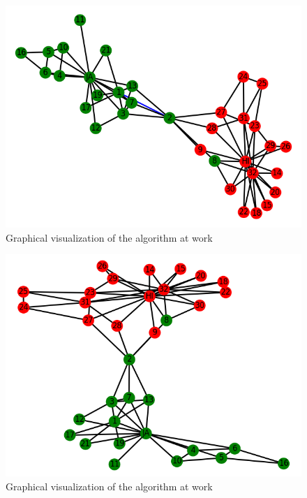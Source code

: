 \documentclass[11pt]{article}
\begin{document}
	\begin{figure}[h!]
		\includegraphics[scale=0.5]{resources/myplot8.png}
		\caption{Graphical visualization of the algorithm at work }
	\end{figure}
	\begin{figure}[h!]
		\includegraphics[scale=0.5]{resources/myplot7.png}
		\caption{Graphical visualization of the algorithm at work }
	\end{figure}
\end{document}
